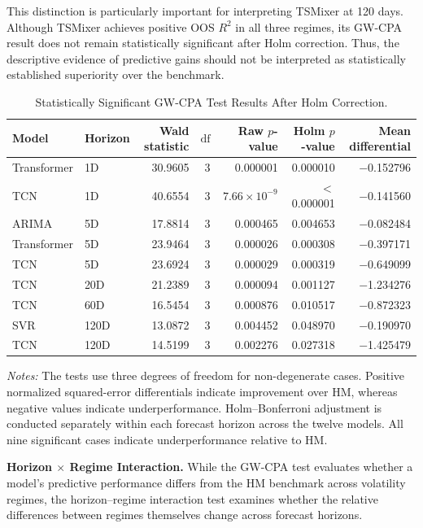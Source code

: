 \documentclass[12pt,twoside]{ord}
\begin{document}
This distinction is particularly important for interpreting TSMixer at 120 days. Although TSMixer achieves positive OOS $R^2$ in all three regimes, its GW-CPA result does not remain statistically significant after Holm correction. Thus, the descriptive evidence of predictive gains should not be interpreted as statistically established superiority over the benchmark.

\begin{table}[htbp]
\centering
\caption{Statistically Significant GW-CPA Test Results After Holm Correction.}\label{tab:h2_gwcpa_sig}
\setlength{\tabcolsep}{4pt}
\begin{tabular}{llrrrrr}
\hline
Model & Horizon & Wald statistic & $\mathrm{df}$ & Raw $p$-value & Holm $p$-value & Mean differential \\
\hline
Transformer & 1D   & 30.9605 & 3 & 0.000001 & 0.000010 & $-$0.152796 \\
TCN         & 1D   & 40.6554 & 3 & $7.66\times 10^{-9}$ & $<$0.000001 & $-$0.141560 \\
ARIMA       & 5D   & 17.8814 & 3 & 0.000465 & 0.004653 & $-$0.082484 \\
Transformer & 5D   & 23.9464 & 3 & 0.000026 & 0.000308 & $-$0.397171 \\
TCN         & 5D   & 23.6924 & 3 & 0.000029 & 0.000319 & $-$0.649099 \\
TCN         & 20D  & 21.2389 & 3 & 0.000094 & 0.001127 & $-$1.234276 \\
TCN         & 60D  & 16.5454 & 3 & 0.000876 & 0.010517 & $-$0.872323 \\
SVR         & 120D & 13.0872 & 3 & 0.004452 & 0.048970 & $-$0.190970 \\
TCN         & 120D & 14.5199 & 3 & 0.002276 & 0.027318 & $-$1.425479 \\
\hline
\end{tabular}
\par\vspace{4pt}\parbox{\linewidth}{\fontsize{9pt}{12pt}\selectfont\textit{Notes:} The tests use three degrees of freedom for non-degenerate cases. Positive normalized squared-error differentials indicate improvement over HM, whereas negative values indicate underperformance. Holm--Bonferroni adjustment is conducted separately within each forecast horizon across the twelve models. All nine significant cases indicate underperformance relative to HM.}
\end{table}

\noindent\textbf{Horizon $\times$ Regime Interaction.}
While the GW-CPA test evaluates whether a model's predictive performance differs from the HM benchmark across volatility regimes, the horizon--regime interaction test examines whether the relative differences between regimes themselves change across forecast horizons.
\end{document}
